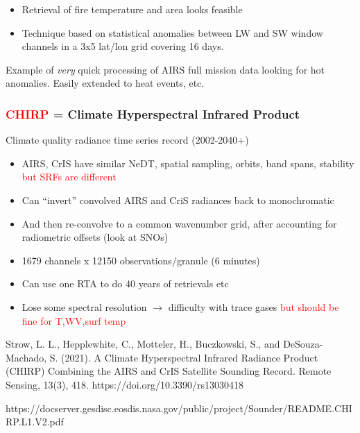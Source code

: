 \documentclass[10pt,t]{beamer}
\begin{document}
\begin{frame}
\vspace{-0.05in}

\small
\vspace{-0.05in}
\begin{itemize}
\item Retrieval of fire temperature and area looks feasible
\item Technique based on statistical anomalies between LW and SW window channels in a 3x5 lat/lon grid covering 16 days.
\end{itemize}
\vspace{-0.05in}
Example of \emph{very} quick processing of AIRS full mission data looking for hot anomalies.   Easily extended to heat events, etc.  
\end{frame}

\begin{frame}
\frametitle{\textcolor{red}{CHIRP} = Climate Hyperspectral Infrared Product}
\small Climate quality radiance time series record (2002-2040+)

\begin{itemize}
  \item AIRS, CrIS have similar NeDT, spatial sampling, orbits, band spans, stability \textcolor{red}{but SRFs are different}
  \item Can ``invert'' convolved AIRS and CriS radiances back to monochromatic
  \item And then re-convolve to a common wavenumber grid, after accounting for radiometric offsets (look at SNOs)
  \item 1679 channels x 12150 observations/granule (6 minutes)
  \item Can use one RTA to do 40 years of retrievals etc
  \item Lose some spectral resolution $\rightarrow$ difficulty with trace gases \textcolor{red}{but should be fine for T,WV,surf temp}
\end{itemize}

\tiny Strow, L. L., Hepplewhite, C., Motteler, H., Buczkowski, S., and DeSouza-Machado, S. (2021). A
Climate Hyperspectral Infrared Radiance Product (CHIRP) Combining the AIRS and CrIS Satellite
Sounding Record. Remote Sensing, 13(3), 418. https://doi.org/10.3390/rs13030418

https://docserver.gesdisc.eosdis.nasa.gov/public/project/Sounder/README.CHIRP.L1.V2.pdf

\end{frame}
\end{document}
